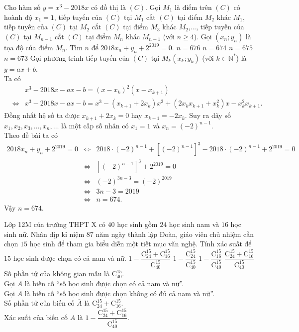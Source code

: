 \begin{ex}%
 Cho hàm số $y=x^3-2018x$ có đồ thị là $(C)$. Gọi $M_1$ là điểm trên $(C)$ có hoành độ $x_1=1$, tiếp tuyến của $(C)$ tại $M_1$ cắt $(C)$ tại điểm $M_2$ khác $M_1$, tiếp tuyến của $(C)$ tại $M_2$ cắt $(C)$ tại điểm $M_3$ khác $M_2$,..., tiếp tuyến của $(C)$ tại $M_{n-1}$ cắt $(C)$ tại điểm $M_n$ khác $M_{n-1}$ (với $n\geq 4$). Gọi $(x_n;y_n)$ là tọa độ của điểm $M_n$. Tìm $n$ để $2018x_n+y_n+2^{2019}=0$.
 \choice
  {$n=676$}
  {\True $n=674$}
  {$n=675$}
  {$n=673$}
 \loigiai
  {
  Gọi phương trình tiếp tuyến của $(C)$ tại $M_k(x_k;y_k)$ (với $k\in\mathbb{N}^*$) là $y=ax+b$.\\
  Ta có
  \begin{eqnarray*}
   && x^3-2018x-ax-b=(x-x_k)^2(x-x_{k+1})\\
   &\Leftrightarrow & x^3-2018x-ax-b=x^3-(x_{k+1}+2x_k)x^2+(2x_kx_{k+1}+x_k^2)x-x_k^2x_{k+1}.
  \end{eqnarray*}
  Đồng nhất hệ số ta được $x_{k+1}+2x_k=0$ hay $x_{k+1}=-2x_k$. Suy ra dãy số $x_1,x_2,x_3,\ldots,x_n,\ldots$ là một cấp số nhân có $x_1=1$ và $x_n=(-2)^{n-1}$.\\
  Theo đề bài ta có
  \begin{eqnarray*}
   2018x_n+y_n+2^{2019}=0 &\Leftrightarrow & 2018\cdot(-2)^{n-1}+\left[(-2)^{n-1}\right]^3-2018\cdot(-2)^{n-1}+2^{2019}=0\\
   &\Leftrightarrow & \left[(-2)^{n-1}\right]^3+2^{2019}=0\\
   &\Leftrightarrow & (-2)^{3n-3}=(-2)^{2019}\\
   &\Leftrightarrow & 3n-3=2019\\
   &\Leftrightarrow & n=674.
  \end{eqnarray*}
  Vậy $n=674$.
  }
\end{ex}

\begin{ex}%
 Lớp 12M của trường THPT X có $40$ học sinh gồm $24$ học sinh nam và $16$ học sinh nữ. Nhân dịp kỉ niệm $87$ năm ngày thành lập Đoàn, giáo viên chủ nhiệm cần chọn $15$ học sinh để tham gia biểu diễn một tiết mục văn nghệ. Tính xác suất để $15$ học sinh được chọn có cả nam và nữ.
 \choice
  {\True $1-\dfrac{\mathrm{C}_{24}^{15}+\mathrm{C}_{16}^{15}}{\mathrm{C}_{40}^{15}}$}
  {$1-\dfrac{\mathrm{C}_{24}^{15}}{\mathrm{C}_{40}^{15}}$}
  {$1-\dfrac{\mathrm{C}_{16}^{15}}{\mathrm{C}_{40}^{15}}$}
  {$\dfrac{\mathrm{C}_{24}^{15}+\mathrm{C}_{16}^{15}}{\mathrm{C}_{40}^{15}}$}
 \loigiai
  {
  Số phần tử của không gian mẫu là $\mathrm{C}_{40}^{15}$.\\
  Gọi $A$ là biến cố ``số học sinh được chọn có cả nam và nữ''.\\
  Gọi $\overline{A}$ là biến cố ``số học sinh được chọn không có đủ cả nam và nữ''.\\
  Số phần tử của biến cố $\overline{A}$ là $\mathrm{C}_{24}^{15}+\mathrm{C}_{16}^{15}$.\\
  Xác suất của biến cố $A$ là $1-\dfrac{\mathrm{C}_{24}^{15}+\mathrm{C}_{16}^{15}}{\mathrm{C}_{40}^{15}}$.
  }
\end{ex}

